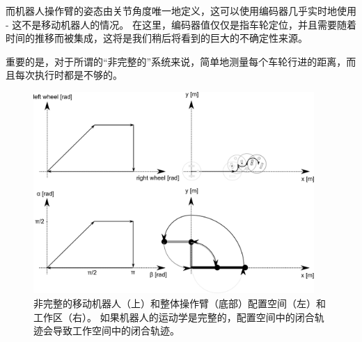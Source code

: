 
而机器人操作臂的姿态由关节角度唯一地定义，这可以使用编码器几乎实时地使用 - 这不是移动机器人的情况。 在这里，编码器值仅仅是指车轮定位，并且需要随着时间的推移而被集成，这将是我们稍后将看到的巨大的不确定性来源。


重要的是，对于所谓的“非完整的”系统来说，简单地测量每个车轮行进的距离，而且每次执行时都是不够的。

\begin{figure}[htb!]
	\centering
		\includegraphics[width=0.95\textwidth]{figs/holonomy.png}
	\caption{非完整的移动机器人（上）和整体操作臂（底部）配置空间（左）和工作区（右）。 如果机器人的运动学是完整的，配置空间中的闭合轨迹会导致工作空间中的闭合轨迹。}
	\label{fig:holonomy}
\end{figure}

